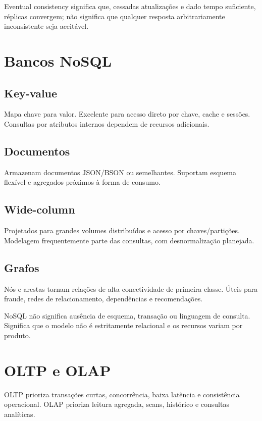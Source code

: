 Eventual consistency significa que, cessadas atualizações e dado tempo suficiente, réplicas convergem; não significa que qualquer resposta arbitrariamente inconsistente seja aceitável.

\section{Bancos NoSQL}

\subsection{Key-value}

Mapa chave para valor. Excelente para acesso direto por chave, cache e sessões. Consultas por atributos internos dependem de recursos adicionais.

\subsection{Documentos}

Armazenam documentos JSON/BSON ou semelhantes. Suportam esquema flexível e agregados próximos à forma de consumo.

\subsection{Wide-column}

Projetados para grandes volumes distribuídos e acesso por chaves/partições. Modelagem frequentemente parte das consultas, com desnormalização planejada.

\subsection{Grafos}

Nós e arestas tornam relações de alta conectividade de primeira classe. Úteis para fraude, redes de relacionamento, dependências e recomendações.

NoSQL não significa ausência de esquema, transação ou linguagem de consulta. Significa que o modelo não é estritamente relacional e os recursos variam por produto.

\section{OLTP e OLAP}

OLTP prioriza transações curtas, concorrência, baixa latência e consistência operacional. OLAP prioriza leitura agregada, scans, histórico e consultas analíticas.


